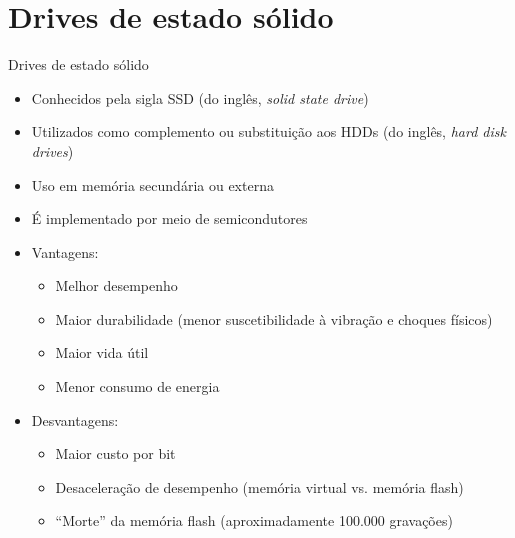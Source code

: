 \section[slide=true]{Drives de estado sólido}
\begin{slide}{Drives de estado sólido}
	\begin{itemize}
		\item Conhecidos pela sigla SSD (do inglês, \emph{solid state drive})
		\item Utilizados como complemento ou substituição aos HDDs (do inglês, \emph{hard disk drives})
		\item Uso em memória secundária ou externa
		\item É implementado por meio de semicondutores
		\item Vantagens:
			\begin{itemize}
				\item Melhor desempenho
				\item Maior durabilidade (menor suscetibilidade à vibração e choques físicos)
				\item Maior vida útil
				\item Menor consumo de energia
			\end{itemize}
		\item Desvantagens: 
			\begin{itemize}
				\item Maior custo por bit
				\item Desaceleração de desempenho (memória virtual vs. memória flash)
				\item ``Morte'' da memória flash (aproximadamente 100.000 gravações)
			\end{itemize}
	\end{itemize}
\end{slide}

